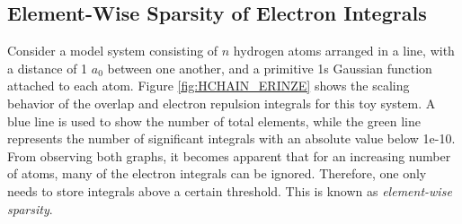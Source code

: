 \FloatBarrier

\subsection{Element-Wise Sparsity of Electron Integrals}

Consider a model system consisting of $n$ hydrogen atoms arranged in a line, with a distance of 1 $a_0$ between one another, and a primitive 1s Gaussian function attached to each atom. Figure \ref{fig:HCHAIN_ERINZE} shows the scaling behavior of the overlap and electron repulsion integrals for this toy system. A blue line is used to show the number of total elements, while the green line represents the number of significant integrals with an absolute value below 1e-10. From observing both graphs, it becomes apparent that for an increasing number of atoms, many of the electron integrals can be ignored. Therefore, one only needs to store integrals above a certain threshold. This is known as \emph{element-wise sparsity}.

